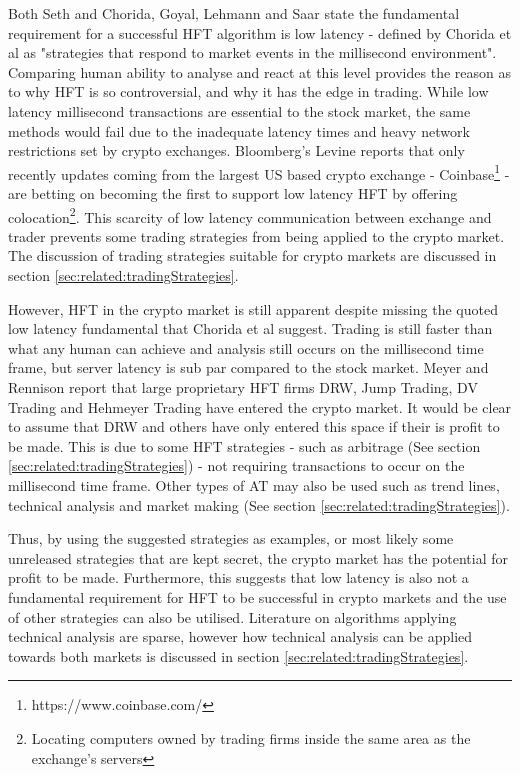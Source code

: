 Both Seth \cite{WEB:SETH:0001} and Chorida, Goyal, Lehmann and Saar \cite{REPORT:ChordiaEtAl:2013} state the fundamental requirement for a successful HFT algorithm is low latency - defined by Chorida et al as "strategies that respond to market events in the millisecond environment". Comparing human ability to analyse and react at this level provides the reason as to why HFT is so controversial, and why it has the edge in trading. While low latency millisecond transactions are essential to the stock market, the same methods would fail due to the inadequate latency times and heavy network restrictions set by crypto exchanges. Bloomberg's Levine reports \cite{WEB:Levine:2018} that only recently updates coming from the largest US based crypto exchange - Coinbase\footnote{https://www.coinbase.com/} - are betting on becoming the first to support low latency HFT by offering colocation\footnote{Locating computers owned by trading firms inside the same area as the exchange's servers}. This scarcity of low latency communication between exchange and trader prevents some trading strategies from being applied to the crypto market. The discussion of trading strategies suitable for crypto markets are discussed in section \ref{sec:related:tradingStrategies}.

However, HFT in the crypto market is still apparent despite missing the quoted low latency fundamental that Chorida et al \cite{REPORT:ChordiaEtAl:2013} suggest. Trading is still faster than what any human can achieve and analysis still occurs on the millisecond time frame, but server latency is sub par compared to the stock market. Meyer and Rennison \cite{ART:Meyer:2017} report that large proprietary HFT firms DRW, Jump Trading, DV Trading and Hehmeyer Trading have entered the crypto market. It would be clear to assume that DRW and others have only entered this space if their is profit to be made. This is due to some HFT strategies - such as arbitrage (See section \ref{sec:related:tradingStrategies}) - not requiring transactions to occur on the millisecond time frame. Other types of AT may also be used such as trend lines, technical analysis and market making (See section \ref{sec:related:tradingStrategies}). 

Thus, by using the suggested strategies as examples, or most likely some unreleased strategies that are kept secret, the crypto market has the potential for profit to be made. Furthermore, this suggests that low latency is also not a fundamental requirement for HFT to be successful in crypto markets and the use of other strategies can also be utilised. Literature on algorithms applying technical analysis are sparse, however how technical analysis can be applied towards both markets is discussed in section \ref{sec:related:tradingStrategies}.

